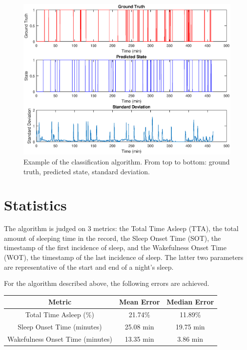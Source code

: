         \begin{figure}[h]
            \includegraphics[width=\textwidth]{Images/example_data_recording.eps}
            \centering
            \caption{Example of the classification algorithm. From top to bottom: ground truth, predicted state, standard deviation.}
            \label{img_ex_data_recording}
        \end{figure}

        \section{Statistics}

            The algorithm is judged on 3 metrics: the Total Time Asleep (TTA), the total amount of sleeping time in the record, the Sleep Onset Time (SOT), the timestamp of the first incidence of sleep, and the Wakefulness Onset Time (WOT), the timestamp of the last incidence of sleep. The latter two parameters are representative of the start and end of a night's sleep. 

            For the algorithm described above, the following errors are achieved.

            \begin{center}
                \label{tbl_sleep_errors}
                \begin{tabular}{|c||c|c|}
                    \hline
                    Metric & Mean Error & Median Error \\
                    \hline
                    Total Time Asleep (\%) & 21.74\% & 11.89\% \\
                    Sleep Onset Time (minutes) & 25.08 min & 19.75 min \\
                    Wakefulness Onset Time (minutes) & 13.35 min & 3.86 min \\
                    \hline
                \end{tabular}
            \end{center}

